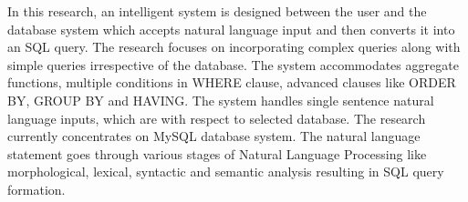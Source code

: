 In this research, an intelligent system is designed between the user and the database system which accepts natural language input and then converts it into an SQL query. The research focuses on incorporating complex queries along with simple queries irrespective of the database. The system accommodates aggregate functions, multiple conditions in WHERE clause, advanced clauses like ORDER BY, GROUP BY and HAVING. The system handles single sentence natural language inputs, which are with respect to selected database. The research currently concentrates on MySQL database system. The natural language statement goes through various stages of Natural Language Processing like morphological, lexical, syntactic and semantic analysis resulting in SQL query formation.
